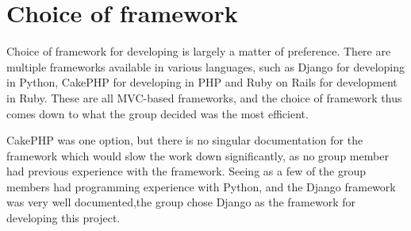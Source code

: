 \section{Choice of framework}

Choice of framework for developing is largely a matter of preference. There 
are multiple frameworks available in various languages, such as 
Django\cite{djangoproject11}  for developing in Python, CakePHP\cite{cake11} 
for developing in PHP and Ruby on Rails\cite{ruby11} for development in Ruby. 
These are all MVC-based frameworks, and the choice of framework thus comes 
down to what the group decided was the most efficient.

CakePHP was one option, but there is no singular documentation for the 
framework\cite{hartjes09} which would slow the work down significantly, as no group member 
had previous experience with the framework. Seeing as a few of the group 
members had programming experience with Python, and the Django framework 
was very well documented,the group chose Django as the framework for 
developing this project.

